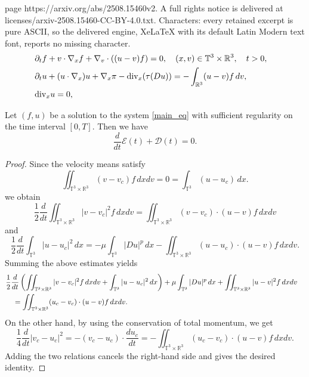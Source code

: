 \documentclass[10pt,a4paper]{amsart}
\newcommand{\R}{\mathbb R}
\newcommand{\T}{\mathbb T}
\newcommand{\calD}{\mathcal{D}}
\newcommand{\calE}{\mathcal{E}}
\newcommand{\inttr}{\iint_{\T^3 \times \R^3}}
\newcommand{\intt}{\int_{\T^3}}
\newcommand{\lt}{\left}
\newcommand{\pa}{\partial}
\newcommand{\rt}{\right}
\begin{document}
page https://arxiv.org/abs/2508.15460v2. A full rights notice is delivered at licenses/arxiv-2508.15460-CC-BY-4.0.txt. Characters: every retained excerpt is pure ASCII, so the delivered engine, XeLaTeX with its default Latin Modern text font, reports no missing character.
\begin{align}\label{main_eq}
\begin{aligned}
&\pa_t f + v \cdot \nabla_x f + \nabla_v \cdot ((u-v)f) = 0,  \quad (x,v) \in \T^3 \times \R^3, \quad t > 0,\cr
&\pa_t u + (u \cdot \nabla_x)u + \nabla_x \pi - \mbox{div}_x (\tau(Du)) = -\int_{\R^3} (u-v)f\,dv, \cr
&\mbox{div}_x u = 0,
\end{aligned}
\end{align}

\begin{lemma} Let $(f,u)$ be a solution to the system \eqref{main_eq} with sufficient regularity on the time interval $[0,T]$. Then we have
\[
\frac{d}{dt} \calE(t) + \calD(t) = 0.
\]
\end{lemma}

\begin{proof}Since the velocity means satisfy
\[
\inttr (v - v_c)f\,dxdv = 0  = \intt (u - u_c)\,dx.
\]
we obtain
\[
\frac12 \frac{d}{dt} \inttr |v - v_c|^2 f\,dxdv = \inttr (v - v_c) \cdot (u-v)f\,dxdv
\] 
and
\[
\frac12 \frac{d}{dt} \intt | u - u_c|^2 \,dx = -  \mu \intt |D u|^p\,dx - \inttr (u - u_c) \cdot (u-v)f\,dxdv.
\]
Summing the above estimates yields
\begin{align*}
&\frac12\frac{d}{dt}\lt( \inttr |v - v_c|^2 f\,dxdv +  \intt | u - u_c|^2 \,dx  \rt) + \mu \intt |D u|^p\,dx +  \inttr |u - v|^2 f\,dxdv \cr
&\quad  = \inttr (u_c - v_c) \cdot (u-v)f\,dxdv.
\end{align*}
On the other hand, by using the conservation of total momentum, we get
\[
\frac14 \frac{d}{dt} | v_c - u_c|^2 = - (v_c - u_c) \cdot \frac{d u_c}{dt} =  -\inttr (u_c - v_c) \cdot (u-v)f\,dxdv.
\]
Adding the two relations cancels the right-hand side and gives the desired identity.
\end{proof}
\end{document}
